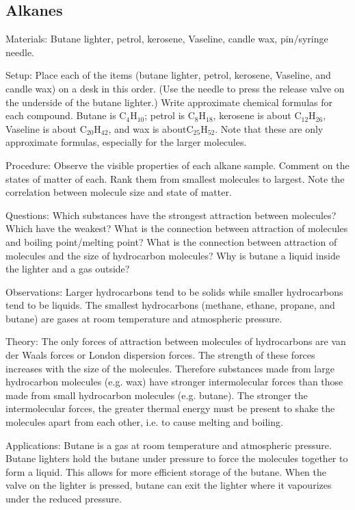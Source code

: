 \begin{multicols}{2}
\subsection{Alkanes} 


\begin{description*}
\item[Materials:]{Butane lighter, petrol, kerosene, Vaseline, candle wax, pin/syringe needle.}
\item[Setup:]{Place each of the items (butane lighter, petrol, kerosene, Vaseline, and candle wax) on a desk in this order. (Use the needle to press the release valve on the underside of the butane lighter.) Write approximate chemical formulas for each compound. Butane is \ce C$_4$H$_{10}$; petrol is \ce C$_8$H$_{18}$, kerosene is about \ce C$_{12}$H$_{26}$, Vaseline is about \ce C$_{20}$H$_{42}$, and wax is about\ce C$_{25}$H$_{52}$. Note that these are only approximate formulas, especially for the larger molecules.}
\item[Procedure:]{Observe the visible properties of each alkane sample. Comment on the states of matter of each. Rank them from smallest molecules to largest. Note the correlation between molecule size and state of matter.}
\item[Questions:]{Which substances have the strongest attraction between molecules? Which have the weakest? What is the connection between attraction of molecules and boiling point/melting point? What is the connection between attraction of molecules and the size of hydrocarbon molecules? Why is butane a liquid inside the lighter and a gas outside?}
\item[Observations:]{Larger hydrocarbons tend to be solids while smaller hydrocarbons tend to be liquids. The smallest hydrocarbons (methane, ethane, propane, and butane) are gases at room temperature and atmospheric pressure.}
\item[Theory:]{The only forces of attraction between molecules of hydrocarbons are van der Waals forces or London dispersion forces. The strength of these forces increases with the size of the molecules. Therefore substances made from large hydrocarbon molecules (e.g. wax) have stronger intermolecular forces than those made from small hydrocarbon molecules (e.g. butane). The stronger the intermolecular forces, the greater thermal energy must be present to shake the molecules apart from each other, i.e. to cause melting and boiling.}
\item[Applications:]{Butane is a gas at room temperature and atmospheric pressure. Butane lighters hold the butane under pressure to force the molecules together to form a liquid. This allows for more efficient storage of the butane. When the valve on the lighter is pressed, butane can exit the lighter where it vapourizes under the reduced pressure.}
\end{description*}


\end{multicols}
